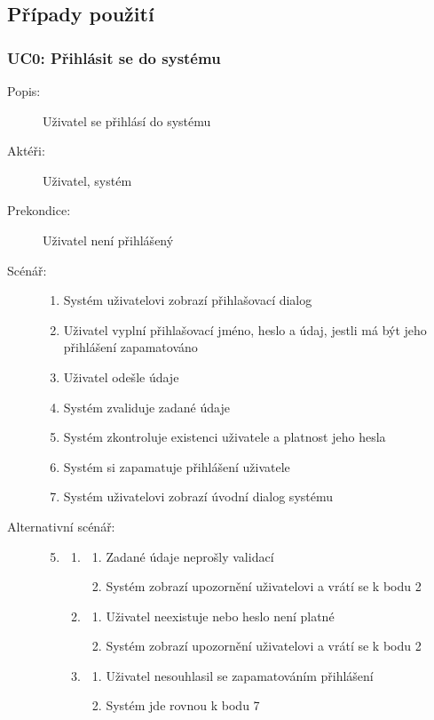 \documentclass[a4paper,10pt,titlepage]{article}
\begin{document}
	\subsection{Případy použití}
	\subsubsection*{UC0: Přihlásit se do systému}
	\begin{description}
		\item[Popis:] Uživatel se přihlásí do systému
		\item[Aktéři:] Uživatel, systém
		\item[Prekondice:] Uživatel není přihlášený
		\item[Scénář:] \hfill
				\begin{enumerate}
					\item Systém uživatelovi zobrazí přihlašovací dialog
					\item Uživatel vyplní přihlašovací jméno, heslo a údaj, jestli má být jeho přihlášení zapamatováno
					\item Uživatel odešle údaje
					\item Systém zvaliduje zadané údaje
					\item Systém zkontroluje existenci uživatele a platnost jeho hesla
					\item Systém si zapamatuje přihlášení uživatele
					\item Systém uživatelovi zobrazí úvodní dialog systému
				\end{enumerate}
		\item[Alternativní scénář:] \hfill
				\begin{enumerate}
					\setcounter{enumi}{4}
					\setcounter{enumii}{0}
					\item \begin{enumerate}[label*=\arabic*.,leftmargin=8pt]
						\item
						\begin{enumerate}[label=\alph*.]
							\item Zadané údaje neprošly validací
							\item Systém zobrazí upozornění uživatelovi a vrátí se k bodu 2
						\end{enumerate}
						\setcounter{enumi}{5}
						\setcounter{enumii}{0}
						\item
						\begin{enumerate}[label=\alph*.]
							\item Uživatel neexistuje nebo heslo není platné
							\item Systém zobrazí upozornění uživatelovi a vrátí se k bodu 2
						\end{enumerate}
						\setcounter{enumi}{6}
						\setcounter{enumii}{0}
						\item
						\begin{enumerate}[label=\alph*.]
							\item Uživatel nesouhlasil se zapamatováním přihlášení
							\item Systém jde rovnou k bodu 7
						\end{enumerate}
					\end{enumerate}		
				\end{enumerate}
	\end{description}
\end{document}
